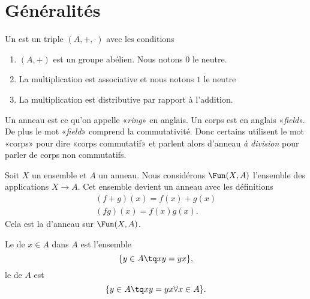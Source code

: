 
\section{Généralités}

\begin{definition}
    Un  est un triple \( (A,+,\cdot)\) avec les conditions
    \begin{enumerate}
        \item
            \( (A,+)\) est un groupe abélien. Nous notons \( 0\) le neutre.
        \item
            La multiplication est associative et nous notons \( 1\) le neutre
        \item
            La multiplication est distributive par rapport à l'addition.
    \end{enumerate}
\end{definition}

\begin{remark}
    Un anneau est ce qu'on appelle «\emph{ring}» en anglais. Un corps est en anglais «\emph{field}». De plus le mot «\emph{field}» comprend la commutativité. Donc certains utilisent le mot «corps» pour dire «corps commutatif» et parlent alors d'anneau \emph{à division} pour parler de corps non commutatifs.
\end{remark}

Soit \( X\) un ensemble et $A$ un anneau. Nous considérons \( \Fun(X,A)\) l'ensemble des applications \( X\to A\). Cet ensemble devient un anneau avec les définitions
\begin{subequations}
    \begin{align}
        (f+g)(x)=f(x)+g(x)\\
        (fg)(x)=f(x)g(x).
    \end{align}
\end{subequations}
Cela est la  d'anneau sur \( \Fun(X,A)\).

Le  de \( x\in A\) dans \( A\) est l'ensemble
\begin{equation}
    \{ y\in A\tq xy=yx \},
\end{equation}
le  de \( A\) est
\begin{equation}
    \{ y\in A\tq xy=yx\forall x\in A \}.
\end{equation}

